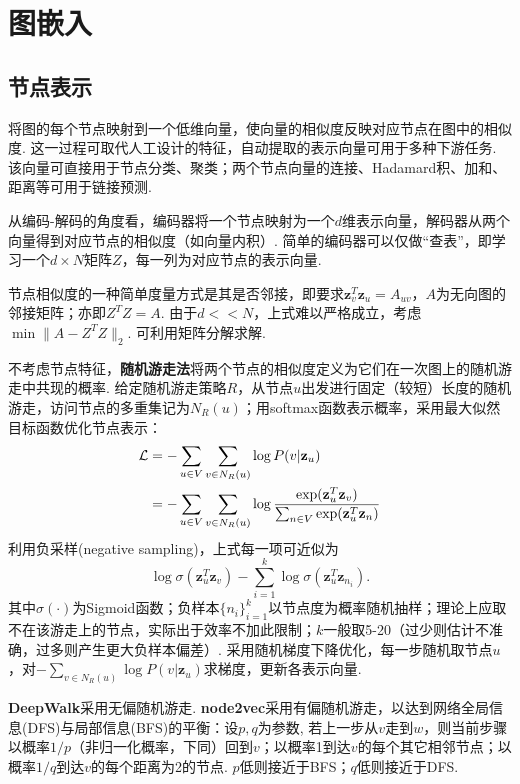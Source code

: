 \section{图嵌入}

\subsection{节点表示}
\par 将图的每个节点映射到一个低维向量，使向量的相似度反映对应节点在图中的相似度. 这一过程可取代人工设计的特征，自动提取的表示向量可用于多种下游任务. 该向量可直接用于节点分类、聚类；两个节点向量的连接、Hadamard积、加和、距离等可用于链接预测. 

\par 从编码-解码的角度看，编码器将一个节点映射为一个$d$维表示向量，解码器从两个向量得到对应节点的相似度（如向量内积）. 简单的编码器可以仅做“查表”，即学习一个$d\times N$矩阵$Z$，每一列为对应节点的表示向量. 

\par 节点相似度的一种简单度量方式是其是否邻接，即要求$\mathbf{z}_v^T\mathbf{z}_u=A_{uv}$，$A$为无向图的邻接矩阵；亦即$Z^T Z=A$. 由于$d<<N$，上式难以严格成立，考虑$\min \|A-Z^T Z\|_2$. 可利用矩阵分解求解. 

\par 不考虑节点特征，\textbf{随机游走法}将两个节点的相似度定义为它们在一次图上的随机游走中共现的概率. 给定随机游走策略$R$，从节点$u$出发进行固定（较短）长度的随机游走，访问节点的多重集记为$N_R(u)$；用softmax函数表示概率，采用最大似然目标函数优化节点表示：
\begin{align}
\mathcal{L}&=-\sum_{u\in V}\sum_{v \in N_R(u)} \log P(v \vert \mathbf{z}_u)\notag \\
&=-\sum_{u\in V}\sum_{v \in N_R(u)}\log \frac{\exp(\mathbf{z}_u^T \mathbf{z}_v)}{\sum_{n\in V}\exp(\mathbf{z}_u^T \mathbf{z}_n)}
\end{align}
利用负采样(negative sampling)，上式每一项可近似为
\begin{equation}
    \log \sigma(\mathbf{z}_u^T \mathbf{z}_v)-\sum_{i=1}^k \log \sigma(\mathbf{z}_u^T \mathbf{z}_{n_i}).
\end{equation}
其中$\sigma(\cdot)$为Sigmoid函数；负样本$\{n_i\}_{i=1}^k$以节点度为概率随机抽样；理论上应取不在该游走上的节点，实际出于效率不加此限制；$k$一般取5-20（过少则估计不准确，过多则产生更大负样本偏差）. 采用随机梯度下降优化，每一步随机取节点$u$，对$-\sum_{v \in N_R(u)} \log P(v \vert \mathbf{z}_u)$求梯度，更新各表示向量. 

\par \textbf{DeepWalk}采用无偏随机游走. \textbf{node2vec}采用有偏随机游走，以达到网络全局信息(DFS)与局部信息(BFS)的平衡：设$p,q$为参数, 若上一步从$v$走到$w$，则当前步骤以概率$1/p$（非归一化概率，下同）回到$v$；以概率1到达$v$的每个其它相邻节点；以概率$1/q$到达$v$的每个距离为2的节点. $p$低则接近于BFS；$q$低则接近于DFS. 

